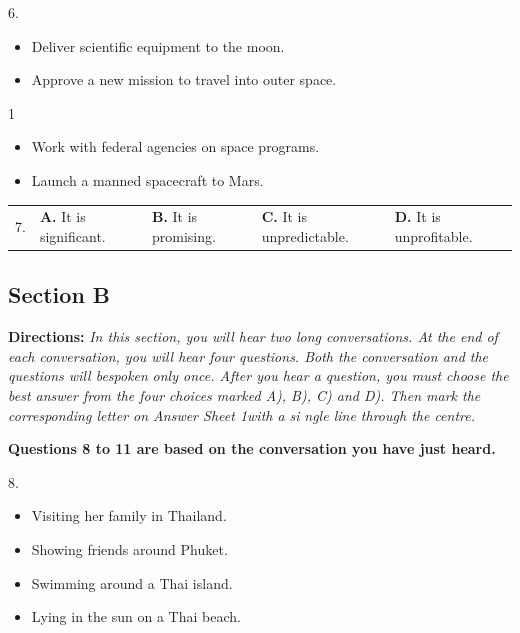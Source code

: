 \documentclass[UTF8,11pt]{ctexart}
\begin{document}
6.


\begin{itemize}[leftmargin=2em,itemsep=.2em,topsep=.4em]\item[A.] Deliver scientific equipment to the moon.
\item[B.] Approve a new mission to travel into outer space.
\end{itemize}

1


\begin{itemize}[leftmargin=2em,itemsep=.2em,topsep=.4em]\item[C.] Work with federal agencies on space programs.
\item[D.] Launch a manned spacecraft to Mars.
\end{itemize}

\noindent\begin{tabularx}{\linewidth}{@{}lXXXX@{}}7. & \textbf{A.} It is significant. & \textbf{B.} It is promising. & \textbf{C.} It is unpredictable. & \textbf{D.} It is unprofitable.\\\end{tabularx}\par

\subsection*{\textbf{Section B}}


\textbf{Directions:}\textit{ In this section, you will hear two long conversations. At the end of each} \textit{conversation, you will hear four questions. Both the conversation and the questions will bespoken} \textit{only once. After you hear a question, you must choose the best answer from the four} \textit{choices marked A), B), C) and D). Then mark the corresponding letter on Answer Sheet 1with a si} \textit{ngle line through the centre.}


\textbf{Questions 8 to 11 are based on the conversation you have just heard.}


8.


\begin{itemize}[leftmargin=2em,itemsep=.2em,topsep=.4em]\item[A.] Visiting her family in Thailand.
\item[B.] Showing friends around Phuket.
\item[C.] Swimming around a Thai island.
\item[D.] Lying in the sun on a Thai beach.
\end{itemize}
\end{document}
